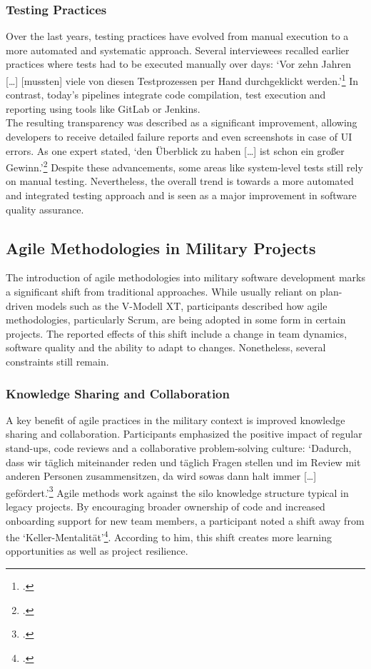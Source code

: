 \subsubsection{Testing Practices}
Over the last years, testing practices have evolved from manual execution to a more automated and systematic approach. Several interviewees recalled earlier practices where tests had to be executed manually over days: `Vor zehn Jahren [\ldots] [mussten] viele von diesen Testprozessen per Hand durchgeklickt werden.'\footcite{Interview22025} In contrast, today's pipelines
integrate code compilation, test execution and reporting using tools like GitLab or Jenkins.\\
The resulting transparency was described as a significant improvement, allowing developers to receive detailed failure reports and even screenshots in case of \ac{UI} errors. As one expert stated, `den Überblick zu haben [\ldots] ist schon ein großer Gewinn.'\footcite{Interview12025}
Despite these advancements, some areas like system-level tests still rely on manual testing. Nevertheless, the overall trend is towards a more automated and integrated testing approach and is seen as a major improvement in software quality assurance.\\

\subsection{Agile Methodologies in Military Projects}
The introduction of agile methodologies into military software development marks a significant shift from traditional approaches. While usually reliant on plan-driven models such as the V-Modell XT, participants described how agile methodologies, particularly Scrum, are being adopted in some form in certain projects.
The reported effects of this shift include a change in team dynamics, software quality and the ability to adapt to changes. Nonetheless, several constraints still remain.

\subsubsection{Knowledge Sharing and Collaboration}
A key benefit of agile practices in the military context is improved knowledge sharing and collaboration. Participants emphasized the positive impact of regular stand-ups, code reviews and a collaborative problem-solving culture: `Dadurch, dass wir täglich miteinander reden und täglich Fragen stellen und im Review mit anderen 
Personen zusammensitzen, da wird sowas dann halt immer [\ldots] gefördert.'\footcite{Interview32025} Agile methods work against the silo knowledge structure typical in legacy projects. By encouraging broader ownership of code and increased onboarding support for new team members, a participant noted a shift away from the `Keller-Mentalität'\footcite{Interview22025}. According to him,
this shift creates more learning opportunities as well as project resilience.\\

